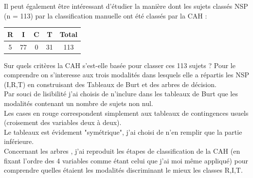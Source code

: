 \documentclass{book}
\begin{document}
\noindent
Il peut également être intéressant d'étudier la manière dont les sujets classés NSP (n = 113) par la classification manuelle ont été classés par la CAH :\\

\begin{center}
\setlength\arrayrulewidth{.5pt}
\begin{tabular}{|c|c|c|c||c|}
\hline
R & I & C & T & Total\\
\hline
5 & 77 & 0 & 31 & 113\\
\hline
\end{tabular}
\end{center}

\noindent
Sur quels critères la CAH s'est-elle basée pour classer ces 113 sujets ? 
Pour le comprendre on s'interesse aux trois modalités dans lesquels elle a répartis les NSP (I,R,T) en construisant des Tableaux de Burt et des arbres de décision.\\
Par souci de lisibilité j'ai choisis de n'inclure dans les tableaux de Burt que les modalités contenant un nombre de sujets non nul.\\
Les cases en rouge correspondent simplement aux tableaux de contingences usuels (croisement des variables deux à deux).\\
Le tableaux est évidement "symétrique", j'ai choisi de n'en remplir que la partie inférieure.\\
Concernant les arbres , j'ai reproduit les étapes de classification de la CAH (en fixant l'ordre des 4 variables comme étant celui que j'ai moi même appliqué) pour comprendre quelles étaient les modalités discriminant le mieux les classes R,I,T.\\
\end{document}
